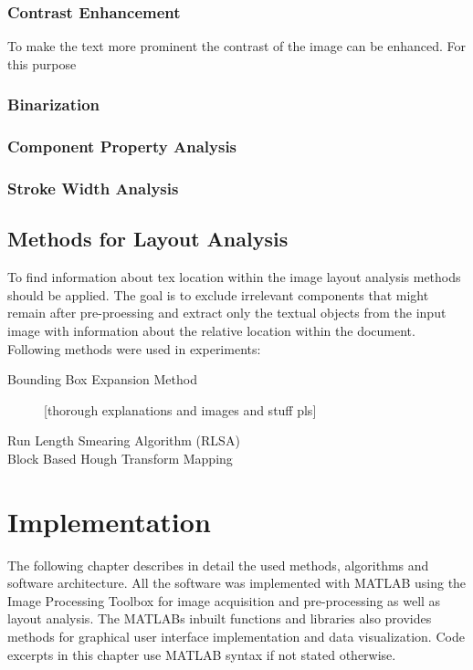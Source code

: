 \documentclass{article}
\begin{document}
        \subsubsection{Contrast Enhancement}
          To make the text more prominent the contrast of the image can be enhanced. For this purpose
        \subsubsection{Binarization}
        \subsubsection{Component Property Analysis}
        \subsubsection{Stroke Width Analysis}


    \subsection{Methods for Layout Analysis}
      To find information about tex location within the image layout analysis methods should be applied. The goal is to exclude irrelevant components that might remain after pre-proessing and extract only the textual objects from the input image with information about the relative location within the document. Following methods were used in experiments:
      \begin{description}
        \item [Bounding Box Expansion Method] [thorough explanations and images and stuff pls]
        \item [Run Length Smearing Algorithm (RLSA)]
        \item [Block Based Hough Transform Mapping]
      \end{description}

  \newpage
  \section{Implementation}
    The following chapter describes in detail the used methods, algorithms and software architecture. All the software was implemented with MATLAB using the Image Processing Toolbox for image acquisition and pre-processing as well as layout analysis.\cite{TheMathWorksa} The MATLABs inbuilt functions and libraries also provides methods for graphical user interface implementation and data visualization. Code excerpts in this chapter use MATLAB syntax if not stated otherwise.
\end{document}

